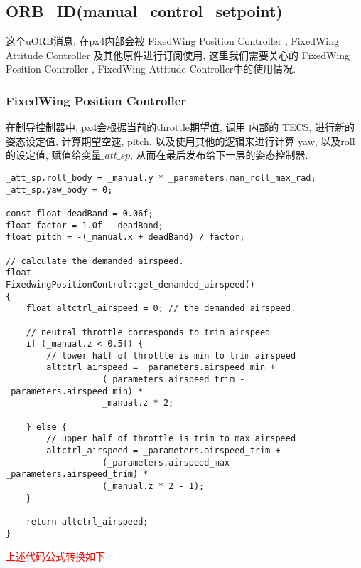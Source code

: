 \subsection{ORB\_ID(manual\_control\_setpoint)}
这个uORB消息, 在px4内部会被 FixedWing Position Controller , FixedWing Attitude Controller 及其他原件进行订阅使用, 
这里我们需要关心的 FixedWing Position Controller , FixedWing Attitude Controller中的使用情况.
\subsubsection{FixedWing Position Controller}
在制导控制器中, px4会根据当前的throttle期望值, 调用 内部的 TECS, 进行新的姿态设定值, 计算期望空速, pitch, 以及使用其他的逻辑来进行计算 yaw, 以及roll的设定值, 赋值给变量$\_att\_sp$, 从而在最后发布给下一层的姿态控制器. 
\begin{lstlisting}[title=计算一些姿态的设定值]
_att_sp.roll_body = _manual.y * _parameters.man_roll_max_rad;
_att_sp.yaw_body = 0;

const float deadBand = 0.06f;
float factor = 1.0f - deadBand;
float pitch = -(_manual.x + deadBand) / factor;

// calculate the demanded airspeed.
float
FixedwingPositionControl::get_demanded_airspeed()
{
	float altctrl_airspeed = 0; // the demanded airspeed.

	// neutral throttle corresponds to trim airspeed
	if (_manual.z < 0.5f) {
		// lower half of throttle is min to trim airspeed
		altctrl_airspeed = _parameters.airspeed_min +
				   (_parameters.airspeed_trim - _parameters.airspeed_min) *
				   _manual.z * 2;

	} else {
		// upper half of throttle is trim to max airspeed
		altctrl_airspeed = _parameters.airspeed_trim +
				   (_parameters.airspeed_max - _parameters.airspeed_trim) *
				   (_manual.z * 2 - 1);
	}

	return altctrl_airspeed;
}
\end{lstlisting}

\textcolor{red}{上述代码公式转换如下}

